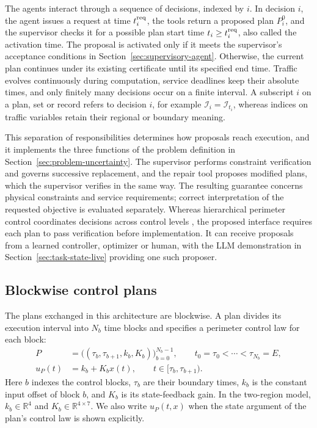 \documentclass[final]{cas-sc}
\theoremstyle{definition}
\theoremstyle{plain}
\theoremstyle{definition}
\theoremstyle{plain}
\newcommand{\R}{\mathbb{R}}
\begin{document}
The agents interact through a sequence of decisions, indexed by $i$.
In decision $i$, the agent issues a request at time $t_i^{\rm req}$,
the tools return a proposed plan $P_i^{0}$, and the supervisor checks
it for a possible plan start time $t_i\ge t_i^{\rm req}$, also called
the activation time. The proposal is activated only if it meets the
supervisor's acceptance conditions in Section~\ref{sec:supervisory-agent}.
Otherwise, the current plan continues under its existing certificate
until its specified end time. Traffic evolves continuously during
computation, service deadlines keep their absolute times, and only
finitely many decisions occur on a finite interval. A subscript $i$ on
a plan, set or record refers to decision $i$, for example
$\mathcal I_i=\mathcal I_{t_i}$, whereas indices on traffic variables
retain their regional or boundary meaning.

This separation of responsibilities determines how proposals reach
execution, and it implements the three functions of the problem
definition in Section~\ref{sec:problem-uncertainty}. The supervisor performs
constraint verification and governs successive replacement, and the
repair tool proposes modified plans, which the supervisor verifies in
the same way. The resulting guarantee concerns physical constraints
and service requirements; correct interpretation of the requested
objective is evaluated separately. Whereas hierarchical perimeter
control coordinates decisions across control levels
\cite{ramezani2015heterogeneity,su2023hierarchical}, the proposed interface
requires each plan to pass verification before implementation. It can
receive proposals from a learned controller, optimizer or human, with
the LLM demonstration in Section~\ref{sec:task-state-live} providing one
such proposer.

\subsection{Blockwise control plans}
\label{sec:control-plans}

The plans exchanged in this architecture are blockwise. A plan divides
its execution interval into $N_b$ time blocks and specifies a
perimeter control law for each block:
\begin{equation}
\begin{aligned}
P&=\big((\tau_b,\tau_{b+1},k_b,K_b)\big)_{b=0}^{N_b-1},
\qquad t_0=\tau_0<\cdots<\tau_{N_b}=E,\\
u_P(t)&=k_b+K_bx(t),\qquad t\in[\tau_b,\tau_{b+1}).
\end{aligned}
\label{eq:control-plan-tuple}
\end{equation}
Here $b$ indexes the control blocks, $\tau_b$ are their boundary
times, $k_b$ is the constant input offset of block $b$, and $K_b$ is
its state-feedback gain. In the two-region model, $k_b\in\R^{4}$ and
$K_b\in\R^{4\times7}$. We also write $u_P(t,x)$ when the state
argument of the plan's control law is shown explicitly.
\end{document}
